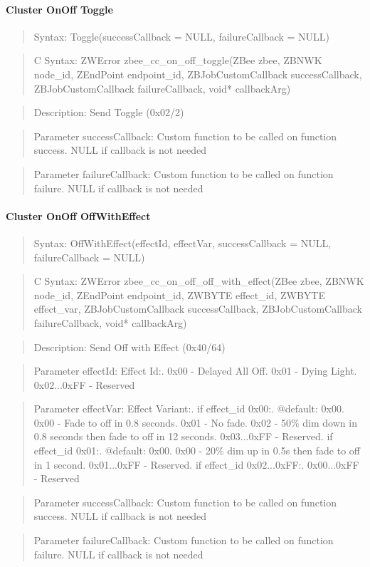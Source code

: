 \paragraph{Cluster OnOff Toggle}
\begin{quote}Syntax: Toggle(successCallback = NULL, failureCallback = NULL)\end{quote}
\begin{quote}C Syntax: ZWError zbee\_cc\_on\_off\_toggle(ZBee zbee, ZBNWK node\_id, ZEndPoint endpoint\_id, ZBJobCustomCallback successCallback, ZBJobCustomCallback failureCallback, void* callbackArg)\end{quote}
\begin{quote}Description: Send Toggle (0x02/2)\end{quote}
\begin{quote}Parameter successCallback: Custom function to be called on function success. NULL if callback is not needed\end{quote}
\begin{quote}Parameter failureCallback: Custom function to be called on function failure. NULL if callback is not needed\end{quote}


\paragraph{Cluster OnOff OffWithEffect}
\begin{quote}Syntax: OffWithEffect(effectId, effectVar, successCallback = NULL, failureCallback = NULL)\end{quote}
\begin{quote}C Syntax: ZWError zbee\_cc\_on\_off\_off\_with\_effect(ZBee zbee, ZBNWK node\_id, ZEndPoint endpoint\_id, ZWBYTE effect\_id, ZWBYTE effect\_var, ZBJobCustomCallback successCallback, ZBJobCustomCallback failureCallback, void* callbackArg)\end{quote}
\begin{quote}Description: Send Off with Effect (0x40/64)\end{quote}
\begin{quote}Parameter effectId: Effect Id:. 0x00        - Delayed All Off. 0x01        - Dying Light. 0x02...0xFF - Reserved\end{quote}
\begin{quote}Parameter effectVar: Effect Variant:. if effect\_id 0x00:. @default: 0x00. 0x00        - Fade to off in 0.8 seconds. 0x01        - No fade. 0x02        - 50\% dim down in 0.8 seconds then fade to off in 12 seconds. 0x03...0xFF - Reserved. if effect\_id 0x01:. @default: 0x00. 0x00        - 20\% dim up in 0.5s then fade to off in 1 second. 0x01...0xFF - Reserved. if effect\_id 0x02...0xFF:. 0x00...0xFF - Reserved\end{quote}
\begin{quote}Parameter successCallback: Custom function to be called on function success. NULL if callback is not needed\end{quote}
\begin{quote}Parameter failureCallback: Custom function to be called on function failure. NULL if callback is not needed\end{quote}


